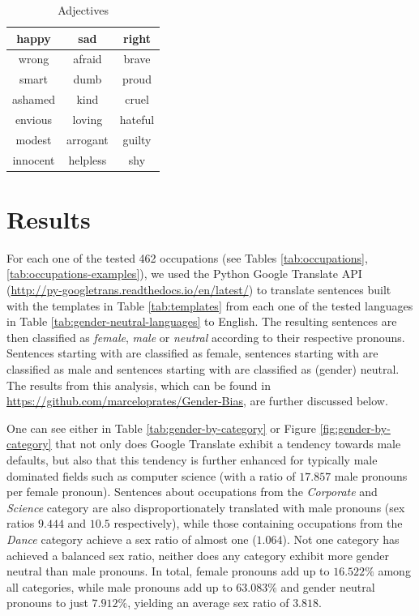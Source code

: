 \documentclass[jair,twoside,11pt,theapa]{article}
\begin{document}
\begin{table}[H]
  \centering
  \begin{tabular}{|c|c|c|}
  \hline
  happy     & sad     & right   \\ \hline
  wrong     & afraid  & brave   \\ \hline
  smart   & dumb    & proud   \\ \hline
  ashamed   & kind    & cruel   \\ \hline
  envious   & loving  & hateful   \\ \hline
  modest    & arrogant  & guilty  \\ \hline
  innocent  & helpless  & shy   \\ \hline
  \end{tabular}
  \caption{Adjectives}
  \label{tab:adjectives}
\end{table}

\section{Results}

For each one of the tested 462 occupations (see Tables \ref{tab:occupations}, \ref{tab:occupations-examples}), we used the Python Google Translate API (\url{http://py-googletrans.readthedocs.io/en/latest/}) to translate sentences built with the templates in Table \ref{tab:templates} from each one of the tested languages in Table \ref{tab:gender-neutral-languages} to English. The resulting sentences are then classified as \emph{female}, \emph{male} or \emph{neutral} according to their respective pronouns. Sentences starting with  are classified as female, sentences starting with  are classified as male and sentences starting with  are classified as (gender) neutral. The results from this analysis, which can be found in \url{https://github.com/marceloprates/Gender-Bias}, are further discussed below.

One can see either in Table \ref{tab:gender-by-category} or Figure \ref{fig:gender-by-category} that not only does Google Translate exhibit a tendency towards male defaults, but also that this tendency is further enhanced for typically male dominated fields such as computer science (with a ratio of $17.857$ male pronouns per female pronoun). Sentences about occupations from the \emph{Corporate} and \emph{Science} category are also disproportionately translated with male pronouns (sex ratios $9.444$ and $10.5$ respectively), while those containing occupations from the \emph{Dance} category achieve a sex ratio of almost one ($1.064$). Not one category has achieved a balanced sex ratio, neither does any category exhibit more gender neutral than male pronouns. In total, female pronouns add up to $16.522\%$ among all categories, while male pronouns add up to $63.083\%$ and gender neutral pronouns to just $7.912\%$, yielding an average sex ratio of $3.818$.
\end{document}
